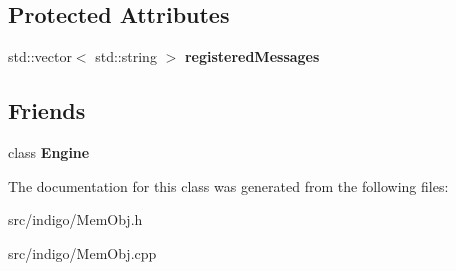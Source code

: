 \subsection*{Protected Attributes}
\begin{DoxyCompactItemize}
\item 
\mbox{\label{class_indigo_1_1_mem_obj_ace3ed963f343268a689144c4546cac8f}} 
std\+::vector$<$ std\+::string $>$ {\bfseries registered\+Messages}
\end{DoxyCompactItemize}
\subsection*{Friends}
\begin{DoxyCompactItemize}
\item 
\mbox{\label{class_indigo_1_1_mem_obj_a3e1914489e4bed4f9f23cdeab34a43dc}} 
class {\bfseries Engine}
\end{DoxyCompactItemize}


The documentation for this class was generated from the following files\+:\begin{DoxyCompactItemize}
\item 
src/indigo/Mem\+Obj.\+h\item 
src/indigo/Mem\+Obj.\+cpp\end{DoxyCompactItemize}

